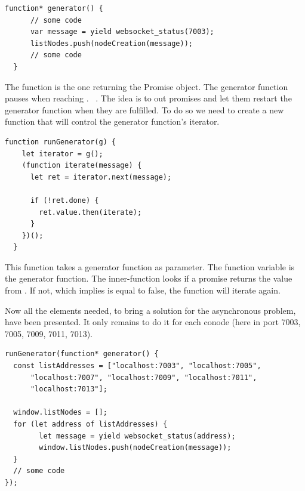 \documentclass[11pt, a4paper, twoside, openright, openany]{article} %
\begin{document}
\begin{lstlisting}[caption={Extract from the project's code}, captionpos=b]
  function* generator() {
      // some code
      var message = yield websocket_status(7003);
      listNodes.push(nodeCreation(message));
      // some code
  }
\end{lstlisting}

The function  is the one returning the Promise object. The generator function
pauses when reaching . ~\cite{runGenerator}.
The idea is to  out promises and let them restart the generator function when
they are fulfilled. To do so we need to create a new function that will control the generator function's iterator.
\bigbreak

\begin{lstlisting}[caption={Extract from the project's code~\cite{runGenerator}}, captionpos=b]
  function runGenerator(g) {
    let iterator = g();
    (function iterate(message) {
      let ret = iterator.next(message);

      if (!ret.done) {
        ret.value.then(iterate);
      }
    })();
  }
\end{lstlisting}

This function takes a generator function as parameter. The  function
variable is the generator function. The inner-function  looks if
a promise returns the value  from .
If not, which implies  is equal to false, the function will iterate again.

Now all the elements needed, to bring a solution for the asynchronous problem, have
been presented. It only remains to do it for each conode (here in port 7003, 7005, 7009, 7011, 7013).
\bigbreak

\begin{lstlisting}[caption={Extract from the project's code reaching some conodes}, captionpos=b]
runGenerator(function* generator() {
  const listAddresses = ["localhost:7003", "localhost:7005",
      "localhost:7007", "localhost:7009", "localhost:7011",
      "localhost:7013"];

  window.listNodes = [];
  for (let address of listAddresses) {
        let message = yield websocket_status(address);
        window.listNodes.push(nodeCreation(message));
  }
  // some code
});
\end{lstlisting}
\end{document}
